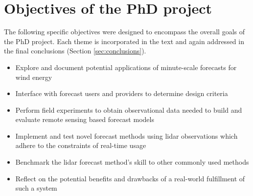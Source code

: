 \chapter{Objectives of the PhD project}
\label{sec:objectives}

The following specific objectives were designed to encompass the overall goals of the PhD project. Each theme is incorporated in the text and again addressed in the final conclusions (Section \ref{sec:conclusions}).

\vspace{0.5cm}

\begin{itemize}
    \item Explore and document potential applications of minute-scale forecasts for wind energy
    \item Interface with forecast users and providers to determine design criteria
    \item Perform field experiments to obtain observational data needed to build and evaluate remote sensing based forecast models
    \item Implement and test novel forecast methods using lidar observations which adhere to the constraints of real-time usage
    \item Benchmark the lidar forecast method's skill to other commonly used methods
    \item Reflect on the potential benefits and drawbacks of a real-world fulfillment of such a system
\end{itemize}